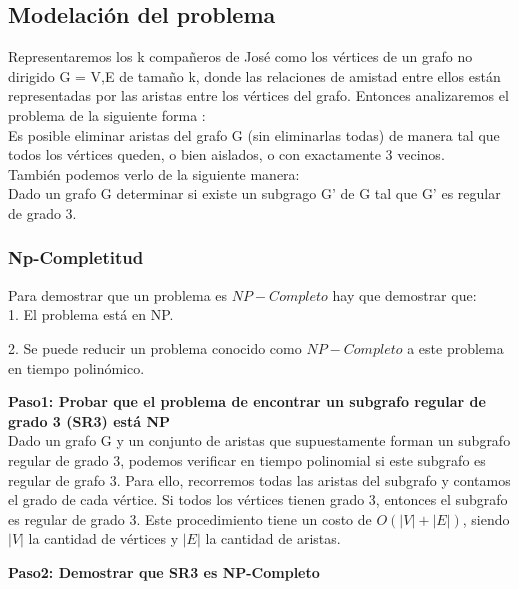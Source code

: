 \documentclass[
10pt, %
a4paper, %
oneside, %
headinclude,footinclude, %
BCOR5mm, %
]{scrartcl}
\begin{document}


\subsection{Modelación del problema}

Representaremos los k compañeros de José como los vértices de un grafo no dirigido G = {V,E} de tamaño k, donde las relaciones de amistad entre ellos están representadas
por las aristas entre los vértices del grafo. Entonces analizaremos el problema de la siguiente forma :\\

Es posible eliminar aristas del grafo G (sin eliminarlas todas) de manera tal que todos los vértices queden, o bien aislados, o con exactamente 3 vecinos. \\

También podemos verlo de la siguiente manera: \\

Dado un grafo G determinar si existe un subgrago G' de G tal que G' es regular de grado 3.


\subsubsection{Np-Completitud}

Para demostrar que un problema es $NP-Completo$ hay que demostrar que:\\

1. El problema está en NP.

2. Se puede reducir un problema conocido como $NP-Completo$ a este problema en tiempo polinómico.

\textbf{Paso1: Probar que el problema de encontrar un subgrafo regular de grado 3 (SR3) está NP }\\


Dado un grafo G y un conjunto de aristas que supuestamente forman un subgrafo regular de grado 3, podemos verificar en 
tiempo polinomial si este subgrafo es regular de grafo 3. Para ello, recorremos todas las aristas del subgrafo y contamos el grado de
cada vértice. Si todos los vértices tienen grado 3, entonces el subgrafo es regular de grado 3. Este procedimiento tiene un costo de 
$O(|V|+|E|)$, siendo $|V|$ la cantidad de vértices y $|E|$ la cantidad de aristas.


\textbf{Paso2: Demostrar que SR3 es NP-Completo}\\
\end{document}
